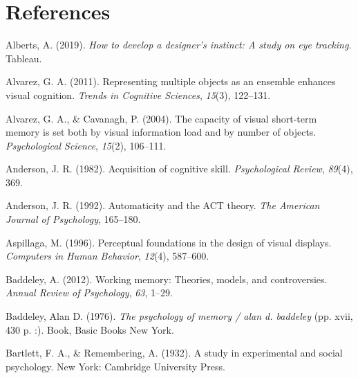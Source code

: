 \documentclass[print]{nuthesis}
\newlength{\cslhangindent}
\newenvironment{CSLReferences}[2]%
{\setlength{\parindent}{0pt}%
\everypar{\setlength{\hangindent}{\cslhangindent}}\ignorespaces}%
{\par}
\begin{document}
\backmatter

\hypertarget{references}{%
\chapter*{References}\label{references}}

\noindent

\setlength{\parindent}{-0.20in}
\setlength{\leftskip}{0.20in}
\setlength{\parskip}{8pt}

\hypertarget{refs}{}
\begin{CSLReferences}{1}{0}
\leavevmode{}%
Alberts, A. (2019). \emph{How to develop a designer's instinct: A study on eye tracking}. Tableau.

\leavevmode{}%
Alvarez, G. A. (2011). Representing multiple objects as an ensemble enhances visual cognition. \emph{Trends in Cognitive Sciences}, \emph{15}(3), 122--131.

\leavevmode{}%
Alvarez, G. A., \& Cavanagh, P. (2004). The capacity of visual short-term memory is set both by visual information load and by number of objects. \emph{Psychological Science}, \emph{15}(2), 106--111.

\leavevmode{}%
Anderson, J. R. (1982). Acquisition of cognitive skill. \emph{Psychological Review}, \emph{89}(4), 369.

\leavevmode{}%
Anderson, J. R. (1992). Automaticity and the ACT theory. \emph{The American Journal of Psychology}, 165--180.

\leavevmode{}%
Aspillaga, M. (1996). Perceptual foundations in the design of visual displays. \emph{Computers in Human Behavior}, \emph{12}(4), 587--600.

\leavevmode{}%
Baddeley, A. (2012). Working memory: Theories, models, and controversies. \emph{Annual Review of Psychology}, \emph{63}, 1--29.

\leavevmode{}%
Baddeley, Alan D. (1976). \emph{The psychology of memory / alan d. baddeley} (pp. xvii, 430 p. :). Book, Basic Books New York.

\leavevmode{}%
Bartlett, F. A., \& Remembering, A. (1932). A study in experimental and social psychology. New York: Cambridge University Press.


\end{CSLReferences}
\end{document}
